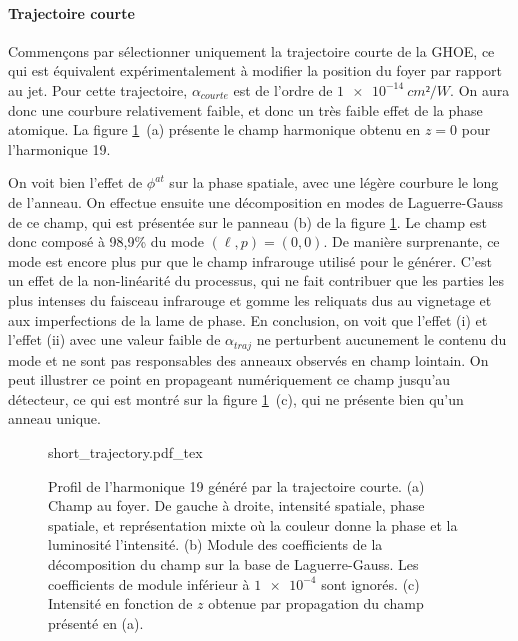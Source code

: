 \paragraph*{Trajectoire courte} Commençons par sélectionner uniquement la trajectoire courte de la GHOE, ce qui est équivalent expérimentalement à modifier la position du foyer par rapport au jet. Pour cette trajectoire, $\alpha_{courte}$ est de l'ordre de $\SI{1e-14}{cm²/W}$. On aura donc une courbure relativement faible, et donc un très faible effet de la phase atomique. La figure \ref{Fig:DecompShort}~(a) présente le champ harmonique obtenu en $z=0$ pour l'harmonique 19.

On voit bien l'effet de $\phi^{at}$ sur la phase spatiale, avec une légère courbure le long de l'anneau. On effectue ensuite une décomposition en modes de Laguerre-Gauss de ce champ, qui est présentée sur le panneau (b) de la figure \ref{Fig:DecompShort}. Le champ est donc composé à 98,9\% du mode $(\ell,p) = (0,0)$. De manière surprenante, ce mode est encore plus pur que le champ infrarouge utilisé pour le générer. C'est un effet de la non-linéarité du processus, qui ne fait contribuer que les parties les plus intenses du faisceau infrarouge et gomme les reliquats dus au vignetage et aux imperfections de la lame de phase. En conclusion, on voit que l'effet (i) et l'effet (ii) avec une valeur faible de $\alpha_{traj}$ ne perturbent aucunement le contenu du mode et ne sont pas responsables des anneaux observés en champ lointain. On peut illustrer ce point en propageant numériquement ce champ jusqu'au détecteur, ce qui est montré sur la figure \ref{Fig:DecompShort}~(c), qui ne présente bien qu'un anneau unique.
\begin{figure}[!ht]
\centering
\def\svgwidth{\columnwidth}
{short_trajectory.pdf_tex}
\caption{Profil de l'harmonique 19 généré par la trajectoire courte. (a) Champ au foyer. De gauche à droite, intensité spatiale, phase spatiale, et représentation mixte où la couleur donne la phase et la luminosité l'intensité. (b) Module des coefficients de la décomposition du champ sur la base de Laguerre-Gauss. Les coefficients de module inférieur à $\num{1e-4}$ sont ignorés. (c) Intensité en fonction de $z$ obtenue par propagation du champ présenté en (a).}
\label{Fig:DecompShort}
\end{figure}

